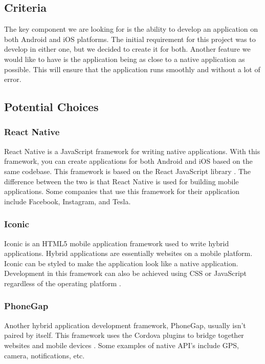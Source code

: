 \documentclass[onecolumn, draftclsnofoot,10pt, compsoc]{IEEEtran}
\begin{document}
\subsection{Criteria}

The key component we are looking for is the ability to develop an application on both Android and iOS platforms. The initial requirement for this project was to develop in either one, but we decided to create it for both. Another feature we would like to have is the application being as close to a native application as possible. This will ensure that the application runs smoothly and without a lot of error. 

\subsection{Potential Choices}
\subsubsection{React Native}
React Native is a JavaScript framework for writing native applications. With this framework, you can create applications for both Android and iOS based on the same codebase. This framework is based on the React JavaScript library \cite{react}. The difference between the two is that React Native is used for building mobile applications. Some companies that use this framework for their application include Facebook, Instagram, and Tesla.
\subsubsection{Iconic}

Iconic is an HTML5 mobile application framework used to write hybrid applications. Hybrid applications are essentially websites on a mobile platform. Iconic can be styled to make the application look like a native application. Development in this framework can also be achieved using CSS or JavaScript regardless of the operating platform \cite{iconic}. 
\subsubsection{PhoneGap}

Another hybrid application development framework, PhoneGap, usually isn't paired by itself. This framework uses the Cordova plugins to bridge together websites and mobile devices \cite{phonegap}. Some examples of native API's include GPS, camera, notifications, etc.
\end{document}
